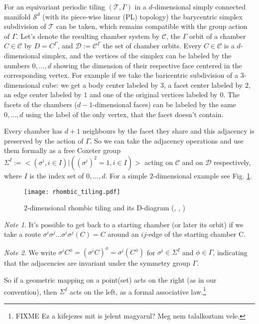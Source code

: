 \documentclass[12pt,a4paper]{article}
\numberwithin{equation}{section}
\theoremstyle{plain}%
\theoremstyle{definition}
\theoremstyle{remark}
\newtheorem*{note}{Note}
\begin{document}
For an equivariant periodic tiling $(\mathcal{T},\Gamma)$ in a $d$-dimensional
simply connected manifold $\mathcal{S}^d$ (with its piece-wise linear (PL)
topology) the barycentric simplex subdivision of $\mathcal{T}$ can be taken,
which remains compatible with the group action of $\Gamma$. Let's denote the
resulting chamber system by $\mathcal{C}$, the $\Gamma$ orbit of a chamber $C\in
\mathcal{C}$ by $D=C^\Gamma$, and $\mathcal{D}:= \mathcal{C}^\Gamma$ the set of
chamber orbits. Every $C\in \mathcal{C}$ is a $d$-dimensional simplex, and the
vertices of the simplex can be labeled by the numbers $0,\ldots,d$ showing the
dimension of their respective face centered in the corresponding vertex. For
example if we take the baricentric subdivision of a $3$-dimensional cube: we get
a body center labeled by $3$, a facet center labeled by $2$, an edge center
labeled by $1$ and one of the original vertices labeled by $0$. The facets of
the chambers ($d-1$-dimensional faces) can be labeled by the same $0,\ldots,d$
using the label of the only vertex, that the facet doesn't contain.

Every chamber has $d+1$ neighbours by the facet they share and this adjacency is
preserved by the action of $\Gamma$. So we can take the adjacency operations and
use them formally as a free Coxeter group $\Sigma^I := <(\sigma^i, i\in I) |
((\sigma^i)^2=1, i\in I)>$ acting on $\mathcal{C}$ and on $\mathcal{D}$
respectively, where $I$ is the index set of $0,\ldots,d$. For a simple
$2$-dimensional example see Fig. \ref{fig:rhombic_tiling}.

\begin{figure}
  \caption{\label{fig:rhombic_tiling} $2$-dimensional rhombic tiling and its
  D-diagram (\usebox{\LegendVertex}, \usebox{\LegendEdge}, \usebox{\LegendFace})}
  \center
  \texttt{[image: rhombic\_tiling.pdf]}
\end{figure}

\begin{note}
  It's possible to get back to a starting chamber (or later its orbit) if we
  take a route $\sigma^i\sigma^j\ldots\sigma^i\sigma^j(C) = C$ around an
  $ij$-edge of the starting chamber C.
\end{note}

\begin{note}
  We write $\sigma^iC^\phi=(\sigma^iC)^\phi=\sigma^i(C^\phi)$ for
  $\sigma^i\in\Sigma^I$ and $\phi\in\Gamma$, indicating that the adjacencies are
  invariant under the symmetry group $\Gamma$.
  
  So if a geometric mapping on a point(set) acts on the right (as in our
  convention), then $\Sigma^I$ acts on the left, as a formal associative
  law.\footnote{FIXME Ez a kifejezes mit is jelent magyarul? Meg nem talalkoztam
  vele.}
\end{note}
\end{document}
